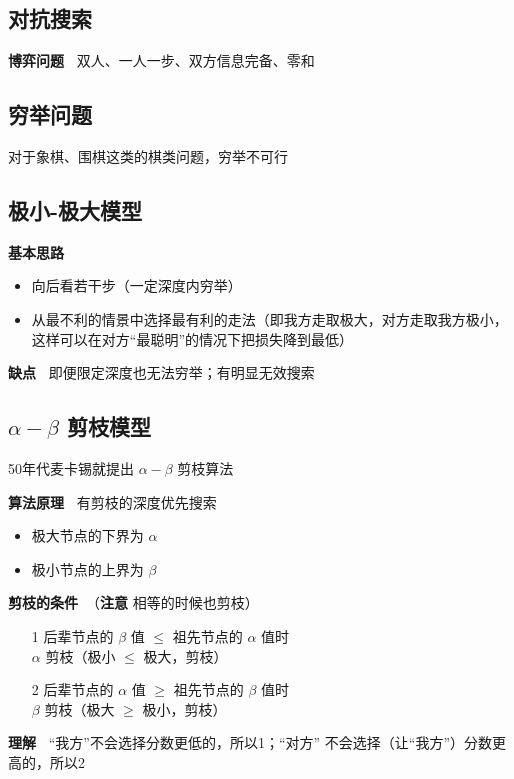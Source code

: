 \documentclass[b4paper, 10pt]{ctexart}
\begin{document}
\begin{multicols}{3}
\section{对抗搜索}
\textbf{博弈问题\ } 双人、一人一步、双方信息完备、零和
\subsection{穷举问题}
对于象棋、围棋这类的棋类问题，穷举不可行
\subsection{极小-极大模型}
\textbf{基本思路\ } 
\begin{itemize}
    \item 向后看若干步（一定深度内穷举）
    \item 从最不利的情景中选择最有利的走法（即我方走取极大，对方走取我方极小，这样可以在对方“最聪明”的情况下把损失降到最低）
\end{itemize}

\textbf{缺点\ } 即便限定深度也无法穷举；有明显无效搜索 

\subsection{$\alpha - \beta $ 剪枝模型}
50年代麦卡锡就提出 $\alpha-\beta$ 剪枝算法

\textbf{算法原理\ } 有剪枝的深度优先搜索 
\begin{itemize}
    \item 极大节点的下界为 $\alpha$
    \item 极小节点的上界为 $\beta$
\end{itemize}

\textbf{剪枝的条件\ }（\textbf{注意 } 相等的时候也剪枝）
\begin{itemize}
    \item[1] 后辈节点的 $\beta$ 值 $\le$ 祖先节点的 $\alpha$ 值时\\ $\alpha$ 剪枝（极小 $\le$ 极大，剪枝）
    \item[2] 后辈节点的 $\alpha$ 值 $\ge$ 祖先节点的 $\beta$ 值时\\ $\beta$ 剪枝（极大 $\ge$ 极小，剪枝）
\end{itemize}


\textbf{理解\ } “我方”不会选择分数更低的，所以1；“对方” 不会选择（让“我方”）分数更高的，所以2


\end{multicols}
\end{document}
